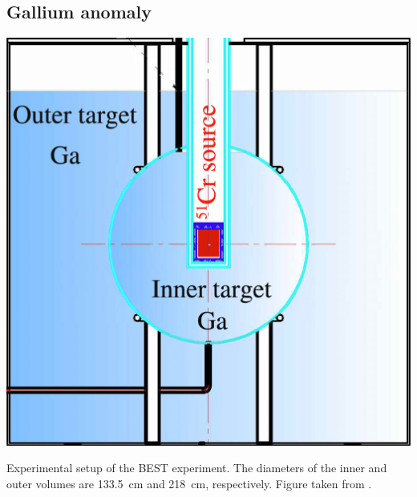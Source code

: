\subsection{Gallium anomaly}
\begin{marginfigure}
    \centering
    \includegraphics{figures/theory/BESTscheme_cropped_small.png}
    \caption{Experimental setup of the BEST experiment. The diameters of the inner and outer volumes are \SI{133.5}{cm} and \SI{218}{cm}, respectively. Figure taken from \cite{Barinov_2022}.\label{fig:best-experiment}}
\end{marginfigure}
